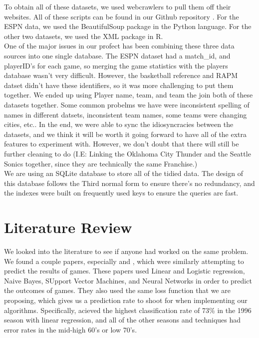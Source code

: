 \documentclass{article}
\begin{document}
	To obtain all of these datasets, we used webcrawlers to pull them off their websites. All of these scripts can be found in our Github repository \cite{gitrepo}. For the ESPN data, we used the BeautifulSoup package in the Python language. For the other two datasets, we used the XML package in R. \\

	One of the major issues in our profect has been combining these three data sources into one single database. The ESPN dataset had a match\_id, and playerID's for each game, so merging the game statistics with the players database wasn't very difficult. However, the basketball reference and RAPM datset didn't have these identifiers, so it was more challenging to put them together. We ended up using Player name, team, and team the join both of these datasets together. Some common probelms we have were inconsistent spelling of names in different datsets, inconsistent team names, some teams were changing cities, etc.. In the end, we were able to sync the idiosyncracies between the datasets, and we think it will be worth it going forward to have all of the extra features to experiment with. However, we don't doubt that there will still be further cleaning to do (I.E: Linking the Oklahoma City Thunder and the Seattle Sonics together, since they are technically the same Franchise.)\\

	We are using an SQLite database to store all of the tidied data. The design of this database follows the Third normal form to ensure there's no redundancy,  and the indexes were built on frequently used keys to ensure the queries are fast. 

\section*{Literature Review}
	We looked into the literature to see if anyone had worked on the same problem. We found a couple papers, especially \cite{nba_oracle} and \cite{data_mining}, which were similarly attempting to predict the results of games. These papers used Linear and Logistic regression, Naive Bayes, SUpport Vector Machines, and Neural Networks in order to predict the outcomes of games. They also used the same loss function that we are proposing, which gives us a prediction rate to shoot for when implementing our algorithms. Specifically, \cite{nba_oracle} acieved the highest classification rate of 73\% in the 1996 season with linear regression, and all of the other seasons and techniques had error rates in the mid-high 60's or low 70's. \\
\end{document}
